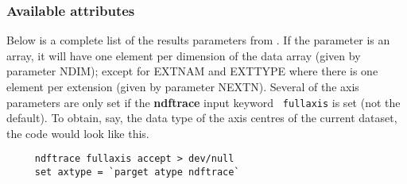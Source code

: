 \subsubsection{Available attributes
\label{sc4_se_dataset_atlist}}

Below is a complete list of the results parameters from
.  If the parameter is an array,
it will have one element per dimension of the data array (given by
parameter NDIM); except for EXTNAM and EXTTYPE where there is one
element per extension (given by parameter NEXTN). Several of the axis
parameters are only set if the {\bf ndftrace} input keyword {\tt
fullaxis} is set (not the default).  To obtain, say, the data type of
the axis centres of the current dataset, the code would look like
this.

\small
\begin{verbatim}
     ndftrace fullaxis accept > dev/null
     set axtype = `parget atype ndftrace`
\end{verbatim}
\normalsize

